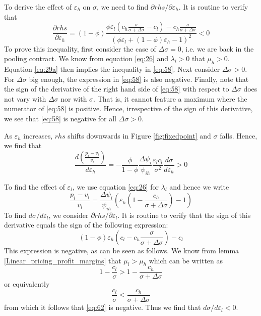 \documentclass[a4paper,12pt]{article}
\begin{document}
To derive the effect of \(\varepsilon_h\) on \(\sigma\), we need to find \(\partial rhs/\partial \varepsilon_h\). It is routine to verify that
\begin{equation}
\label{eq:58}
\frac{\partial rhs}{\partial \varepsilon_h} =
(1-\phi) \frac{\phi \varepsilon_l (c_h \frac{\sigma}{\sigma+\Delta\sigma}-c_l)-c_h \frac{\sigma}{\sigma+\Delta\sigma}}{(\phi \varepsilon_l + (1-\phi)\varepsilon_h -1)^2} < 0
\end{equation}
To prove this inequality, first consider the case of \(\Delta \sigma=0\), i.e. we are back in the pooling contract. We know from equation \eqref{eq:26} and \(\lambda_l>0\) that \(\mu_h>0\). Equation \eqref{eq:29a} then implies the inequality in \eqref{eq:58}. Next consider \(\Delta \sigma > 0\). For \(\Delta \sigma\) big enough, the expression in \eqref{eq:58} is also negative. Finally, note that the sign of the derivative of the right hand side of \eqref{eq:58} with respect to \(\Delta \sigma\) does not vary with \(\Delta \sigma\) nor with \(\sigma\). That is, it cannot feature a maximum where the numerator of \eqref{eq:58} is positive. Hence, irrespective of the sign of this derivative, we see that \eqref{eq:58} is negative for all \(\Delta \sigma > 0\).

As \(\varepsilon_h\) increases, \(rhs\) shifts downwards in Figure \ref{fig:fixedpoint} and \(\sigma\) falls. Hence, we find that
\begin{equation}
\label{eq:45}
\frac{d\left(\frac{p_i-v_i}{v_i} \right)}{d \varepsilon_h} = - \frac{\phi}{1-\phi} \frac{\Delta \psi_i}{\psi_{ih}} \frac{\varepsilon_l c_l}{\sigma^2} \frac{d\sigma}{d\varepsilon_h} > 0
\end{equation}

To find the effect of \(\varepsilon_l\), we use equation \eqref{eq:26} for \(\lambda_l\) and hence we write
\begin{equation}
\label{eq:61}
\frac{p_i-v_i}{v_i} = \frac{\Delta\psi_i}{\psi_{ih}} \left(\varepsilon_h \left( 1-\frac{c_h}{\sigma+\Delta\sigma}\right)-1 \right)
\end{equation}
To find \(d\sigma/d\varepsilon_l\), we consider \(\partial rhs/\partial \varepsilon_l\). It is routine to verify that the sign of this derivative equals the sign of the following expression:
\begin{equation}
\label{eq:62}
(1-\phi) \varepsilon_h \left(c_l-c_h \frac{\sigma}{\sigma+\Delta\sigma} \right) - c_l
\end{equation}
This expression is negative, as can be seen as follows. We know from lemma \ref{Linear_pricing_profit_margins} that \(\mu_l>\mu_h\) which can be written as
\begin{equation}
\label{eq:70}
1-\frac{c_l}{\sigma} > 1-\frac{c_h}{\sigma+\Delta\sigma}
\end{equation}
or equivalently
\begin{equation}
\label{eq:71}
\frac{c_l}{\sigma} < \frac{c_h}{\sigma+\Delta\sigma}
\end{equation}
from which it follows that \eqref{eq:62} is negative. Thus we find that \(d\sigma/d\varepsilon_l<0\).
\end{document}
